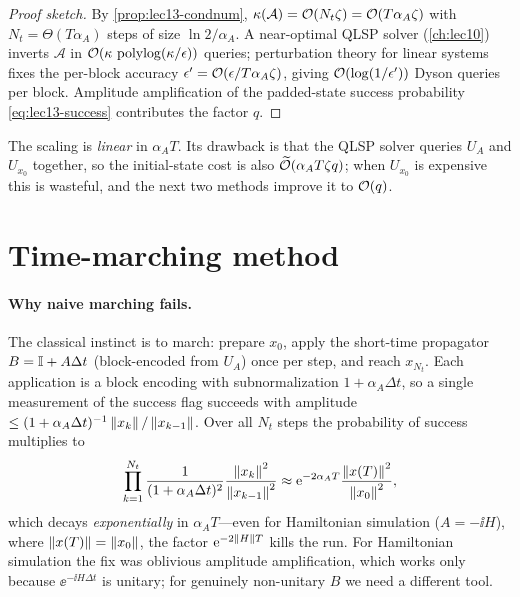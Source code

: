 \begin{proof}[Proof sketch]
By \cref{prop:lec13-condnum}, $\kappa(\mathcal A)=\mathcal{O}(N_t\zeta)=\mathcal{O}(T\alpha_A\zeta)$ with
$N_t=\Theta(T\alpha_A)$ steps of size $\ln2/\alpha_A$. A near-optimal QLSP solver
(\cref{ch:lec10}) inverts $\mathcal A$ in $\mathcal{O}(\kappa\,\operatorname{polylog}(\kappa/\epsilon))$ queries;
perturbation theory for linear systems fixes the per-block accuracy $\epsilon'=\mathcal{O}(\epsilon/
T\alpha_A\zeta)$, giving $\mathcal{O}(\log(1/\epsilon'))$ Dyson queries per block. Amplitude
amplification of the padded-state success probability \eqref{eq:lec13-success} contributes the
factor $q$.
\end{proof}

The scaling is \emph{linear} in $\alpha_A T$. Its drawback is that the QLSP solver queries $U_A$
and $U_{x_0}$ together, so the initial-state cost is also $\widetilde{\mathcal{O}}(\alpha_A T\zeta q)$;
when $U_{x_0}$ is expensive this is wasteful, and the next two methods improve it to $\mathcal{O}(q)$.

\section{Time-marching method}
\label{sec:lec13-3}

\paragraph{Why naive marching fails.}
The classical instinct is to march: prepare $x_0$, apply the short-time propagator $B=\mathbb{I}+
A\Delta t$ (block-encoded from $U_A$) once per step, and reach $x_{N_t}$. Each application is a
block encoding with subnormalization $1+\alpha_A\Delta t$, so a single measurement of the
success flag succeeds with amplitude $\le(1+\alpha_A\Delta t)^{-1}\left\lVert x_k \right\rVert/\left\lVert x_{k-1} \right\rVert$.
Over all $N_t$ steps the probability of success multiplies to
\begin{equation}
  \prod_{k=1}^{N_t}\frac{1}{(1+\alpha_A\Delta t)^2}\frac{\left\lVert x_k \right\rVert^2}{\left\lVert x_{k-1} \right\rVert^2}
  \approx\mathrm{e}^{-2\alpha_A T}\frac{\left\lVert x(T) \right\rVert^2}{\left\lVert x_0 \right\rVert^2},
  \label{eq:lec13-march-fail}
\end{equation}
which decays \emph{exponentially} in $\alpha_A T$---even for Hamiltonian simulation
($A=-\ii H$), where $\left\lVert x(T) \right\rVert=\left\lVert x_0 \right\rVert$, the factor $\mathrm{e}^{-2\left\lVert H \right\rVert T}$ kills the run.
For Hamiltonian simulation the fix was oblivious amplitude amplification, which works only
because $\ee^{-\ii H\Delta t}$ is unitary; for genuinely non-unitary $B$ we need a different
tool.

